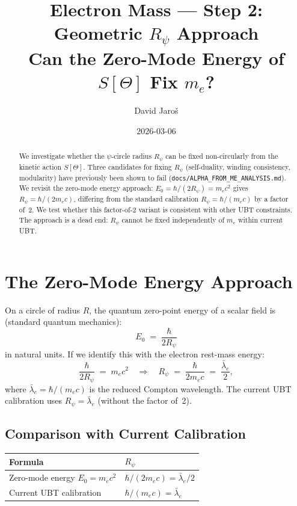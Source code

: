 \documentclass[12pt,a4paper]{article}
\title{\textbf{Electron Mass --- Step 2: Geometric $R_\psi$ Approach}\\
         \large Can the Zero-Mode Energy of $S[\Theta]$ Fix $m_e$?}
\author{David Jaro\v{s}}
\date{2026-03-06}
\theoremstyle{definition}
\theoremstyle{remark}
\begin{document}
  \maketitle

  \begin{abstract}
  We investigate whether the $\psi$-circle radius $R_\psi$ can be fixed
  non-circularly from the kinetic action $S[\Theta]$.  Three candidates
  for fixing $R_\psi$ (self-duality, winding consistency, modularity) have
  previously been shown to fail (\texttt{docs/ALPHA\_FROM\_ME\_ANALYSIS.md}).
  We revisit the zero-mode energy approach:
  $E_0 = \hbar/(2R_\psi) = m_e c^2$ gives $R_\psi = \hbar/(2m_e c)$,
  differing from the standard calibration $R_\psi = \hbar/(m_e c)$
  by a factor of~2.  We test whether this factor-of-2 variant is
  consistent with other UBT constraints.  The approach is a dead end:
  $R_\psi$ cannot be fixed independently of $m_e$ within current UBT.
  \end{abstract}
\fi

\section{The Zero-Mode Energy Approach}
\label{sec:zero_mode}

On a circle of radius $R$, the quantum zero-point energy of a scalar
field is (standard quantum mechanics):
\begin{equation}
  E_0 \;=\; \frac{\hbar}{2R_\psi}
  \label{eq:zero_mode}
\end{equation}
in natural units.  If we identify this with the electron rest-mass energy:
\begin{equation}
  \frac{\hbar}{2R_\psi} \;=\; m_e c^2
  \quad\Longrightarrow\quad
  R_\psi \;=\; \frac{\hbar}{2 m_e c} \;=\; \frac{\bar\lambda_e}{2},
\end{equation}
where $\bar\lambda_e = \hbar/(m_e c)$ is the reduced Compton wavelength.
The current UBT calibration uses $R_\psi = \bar\lambda_e$ (without the
factor of~2).

\subsection{Comparison with Current Calibration}

\begin{center}
\begin{tabular}{ll}
  \toprule
  Formula & $R_\psi$ \\
  \midrule
  Zero-mode energy $E_0 = m_e c^2$ & $\hbar/(2m_e c) = \bar\lambda_e/2$ \\
  Current UBT calibration & $\hbar/(m_e c) = \bar\lambda_e$ \\
  \bottomrule
\end{tabular}
\end{center}
\end{document}
